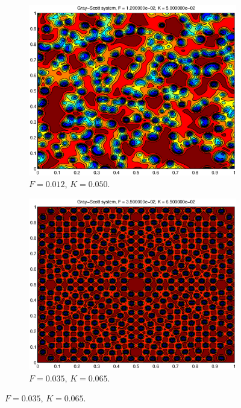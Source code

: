 \documentclass[a4paper,11pt]{article}
\begin{document}
\begin{figure}
    \centering
    \begin{subfigure}[b]{0.48\textwidth}
        \centering
        \includegraphics[width=\textwidth]{FK1250}
        \caption{$F = 0.012$, $K = 0.050$.}
        \label{fig:FK1250}
    \end{subfigure}
    \hfill
    \begin{subfigure}[b]{0.48\textwidth}
        \centering
        \includegraphics[width=\textwidth]{FK3565}
        \caption{$F = 0.035$, $K = 0.065$.}
        \label{fig:FK3565}

\end{subfigure}
\end{figure}
\end{document}
